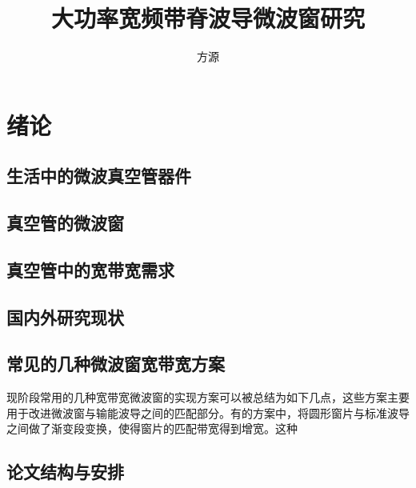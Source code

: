 \documentclass[master]{thesis-uestc}
\title{大功率宽频带脊波导微波窗研究}{English Title} %
\author{方源}{English Name} %
\begin{document}
\makecover %
\originalitydeclaration %
\begin{chineseabstract}

\end{chineseabstract}
\begin{englishabstract}

\end{englishabstract}

\thesistableofcontents %
\thesisfigurelist %
\thesistablelist %
\thesisglossarylist %
\thesissymbollist %



\chapter{绪\hspace{6pt}论}
\section{生活中的微波真空管器件}
\section{真空管的微波窗}
\section{真空管中的宽带宽需求}
\section{国内外研究现状}
\section{常见的几种微波窗宽带宽方案}
现阶段常用的几种宽带宽微波窗的实现方案可以被总结为如下几点，这些方案主要用于改进微波窗与输能波导之间的匹配部分。有的方案中，将圆形窗片与标准波导之间做了渐变段变换，使得窗片的匹配带宽得到增宽。这种
\section{论文结构与安排}
\end{document}
